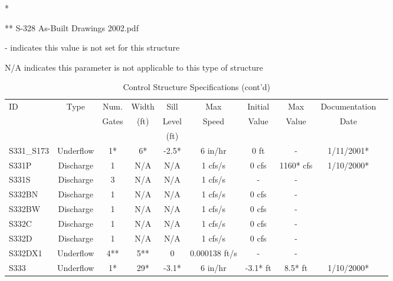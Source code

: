 \begin{table}[h]
* \cite{corp2005}

** S-328 As-Built Drawings 2002.pdf

- indicates this value is not set for this structure

N/A indicates this parameter is not applicable to this type of structure
\end{table}
\normalsize

\scriptsize
\begin{table}[h]
\caption{Control Structure Specifications (cont'd)}
\label{tab:struc-specs3}
\begin{tabular}{@{}lccccccccc@{}}
\toprule
{ID}            & {Type}        & Num.     & Width       & Sill         & Max         & Initial         & Max     & Documentation  \\
                &               & Gates    & (ft)        & Level        & Speed       & Value           & Value   & Date           \\
                &               &          &             & (ft)         &             &                 &         &                \\
\hline
{S331\_S173}    & Underflow     & 1*       & 6*          & -2.5*        & 6 in/hr        & 0 ft            & -          & 1/11/2001*  \\
{S331P}         & Discharge     & 1        & N/A         & N/A          & 1 cfs/s        & 0 cfs           & 1160* cfs  & 1/10/2000*  \\
{S331S}         & Discharge     & 3        & N/A         & N/A          & 1 cfs/s        & -               & -          &             \\
{S332BN}        & Discharge     & 1        & N/A         & N/A          & 1 cfs/s        & 0 cfs           & -          &             \\
{S332BW}        & Discharge     & 1        & N/A         & N/A          & 1 cfs/s        & 0 cfs           & -          &             \\
{S332C}         & Discharge     & 1        & N/A         & N/A          & 1 cfs/s        & 0 cfs           & -          &             \\
{S332D}         & Discharge     & 1        & N/A         & N/A          & 1 cfs/s        & 0 cfs           & -          &             \\
{S332DX1}       & Underflow     & 4**      & 5**         & 0            & 0.000138 ft/s  & -               & -          &             \\
{S333}          & Underflow     & 1*       & 29*         & -3.1*        & 6 in/hr        & -3.1* ft        & 8.5* ft    & 1/10/2000*  \\

\end{tabular}
\end{table}
